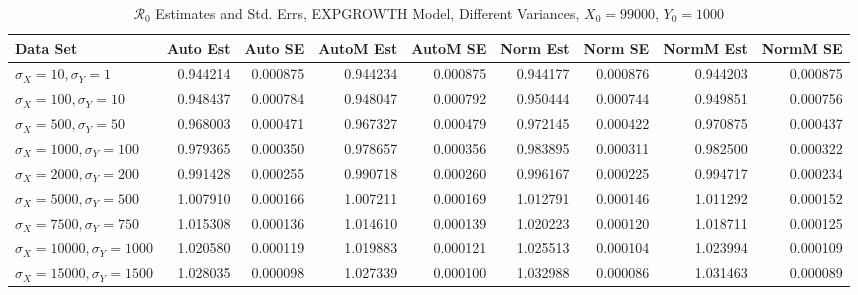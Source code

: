 \documentclass[12pt]{article}
\newcommand{\rr}{\ensuremath{\mathcal{R}_0}}
\begin{document}
\begin{table}[H]
	
	\caption{$\rr$ Estimates and Std. Errs, EXPGROWTH Model, 
		Different Variances, $X_0 = 99000$, $Y_0 = 1000$}
	\begin{footnotesize}
		\hskip -1.7cm
		\begin{tabular}{l|r|r|r|r|r|r|r|r}
			\hline
			Data Set & Auto Est & Auto SE & AutoM Est & AutoM SE & Norm Est & Norm SE & NormM Est & NormM SE\\
			\hline
			$\sigma_X = 10, \sigma_Y = 1$ & 0.944214 & 0.000875 & 0.944234 & 0.000875 & 0.944177 & 0.000876 & 0.944203 & 0.000875\\
			\hline
			$\sigma_X = 100, \sigma_Y = 10$ & 0.948437 & 0.000784 & 0.948047 & 0.000792 & 0.950444 & 0.000744 & 0.949851 & 0.000756\\
			\hline
			$\sigma_X = 500, \sigma_Y = 50$ & 0.968003 & 0.000471 & 0.967327 & 0.000479 & 0.972145 & 0.000422 & 0.970875 & 0.000437\\
			\hline
			$\sigma_X = 1000, \sigma_Y = 100$ & 0.979365 & 0.000350 & 0.978657 & 0.000356 & 0.983895 & 0.000311 & 0.982500 & 0.000322\\
			\hline
			$\sigma_X = 2000, \sigma_Y = 200$ & 0.991428 & 0.000255 & 0.990718 & 0.000260 & 0.996167 & 0.000225 & 0.994717 & 0.000234\\
			\hline
			$\sigma_X = 5000, \sigma_Y = 500$ & 1.007910 & 0.000166 & 1.007211 & 0.000169 & 1.012791 & 0.000146 & 1.011292 & 0.000152\\
			\hline
			$\sigma_X = 7500, \sigma_Y = 750$ & 1.015308 & 0.000136 & 1.014610 & 0.000139 & 1.020223 & 0.000120 & 1.018711 & 0.000125\\
			\hline
			$\sigma_X = 10000, \sigma_Y = 1000$ & 1.020580 & 0.000119 & 1.019883 & 0.000121 & 1.025513 & 0.000104 & 1.023994 & 0.000109\\
			\hline
			$\sigma_X = 15000, \sigma_Y = 1500$ & 1.028035 & 0.000098 & 1.027339 & 0.000100 & 1.032988 & 0.000086 & 1.031463 & 0.000089\\
			\hline
		\end{tabular}
	\end{footnotesize}
\end{table}
\end{document}
